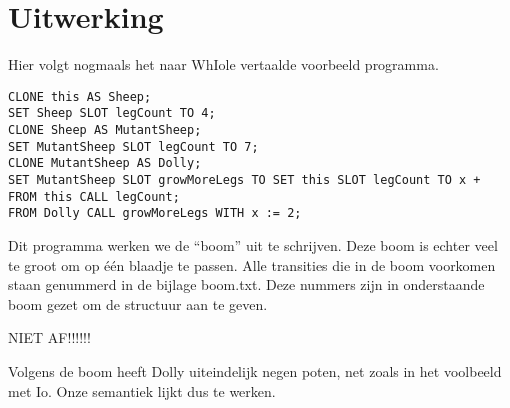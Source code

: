 \documentclass[12pt]{article}
\begin{document}
\pagebreak
\section{Uitwerking}
Hier volgt nogmaals het naar WhIole vertaalde voorbeeld programma.

\begin{lstlisting}[frame=single]
CLONE this AS Sheep;
SET Sheep SLOT legCount TO 4;
CLONE Sheep AS MutantSheep;
SET MutantSheep SLOT legCount TO 7;
CLONE MutantSheep AS Dolly;
SET MutantSheep SLOT growMoreLegs TO SET this SLOT legCount TO x + FROM this CALL legCount;
FROM Dolly CALL growMoreLegs WITH x := 2;
\end{lstlisting}

Dit programma werken we de ``boom'' uit te schrijven.
Deze boom is echter veel te groot om op één blaadje te passen.
Alle transities die in de boom voorkomen staan genummerd in de bijlage boom.txt.
Deze nummers zijn in onderstaande boom gezet om de structuur aan te geven.

NIET AF!!!!!!

Volgens de boom heeft Dolly uiteindelijk negen poten, net zoals in het voolbeeld met Io.
Onze semantiek lijkt dus te werken.
\iffalse
\appendix
\section{Planning}
Vrijdag 29 april: \\Het werkstuk voldoet aan de eisen van eerste versie.\newline\newline %
Dinsdag 10 mei: \\Het hoofdstuk over de syntax van Io is helemaal klaar en willen we al aardig op weg zijn met de semantiek.\newline\newline
Dinsdag 24 mei: \\Het hoofdstuk over de semantiek is compleet. We bedoelen hier niet mee dat dat hoofdstuk helemaal klaar en perfect is, maar
dat het zodanig is dat we het kunnen gebruiken om de rest van het werkstuk te kunnen maken.\newline\newline
Vrijdag 27 mei: \\Het werkstuk voldoet aan de eisen van de tweede versie. Dat wil zeggen: het inleidende hoofdstuk is af, het hoofdstuk over de syntax is af, het hoofdstuk over de semantiek is af, het hoofdstuk over de analyse bevat in elk geval het programma dat geanalyseerd gaat worden.\newline\newline
Vrijdag 17 juni: \\De definitieve versie van het werkstuk is gereed en ingeleverd.
\fi
\end{document}

